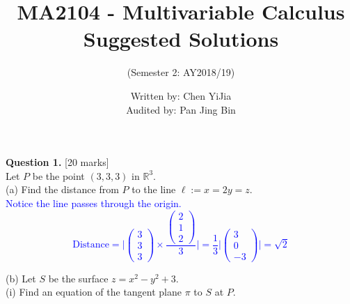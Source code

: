 \documentclass[12pt]{article}
\newcommand{\R}{\mathbb{R}}
\begin{document}
 
\title{MA2104 - Multivariable Calculus Suggested Solutions}
\author{(Semester 2: AY2018/19)}
\date{Written by: Chen YiJia\\Audited by: Pan Jing Bin}

\maketitle
 

{\bf Question 1.} [20 marks]\\
\indent Let $P$ be the point $(3,3,3)$ in $\R^3$.\\

(a) Find the distance from $P$ to the line $\ell:=x=2y=z$.\\

\textcolor{blue}{
Notice the line passes through the origin.
\[
	\text{Distance}=\Bigg|\begin{pmatrix}3\\3\\3 \end{pmatrix} \times 
	\frac{\begin{pmatrix}2\\1\\2 \end{pmatrix}}{3}\Bigg|=
	\frac{1}{3}\Bigg|\begin{pmatrix} 3\\0\\-3 \end{pmatrix}\Bigg|=\sqrt{2}
\]
}

(b) Let $S$ be the surface $z=x^2-y^2+3$.\\
\indent\indent
(i) Find an equation of the tangent plane $\pi$ to $S$ at $P$.\\
\end{document}
